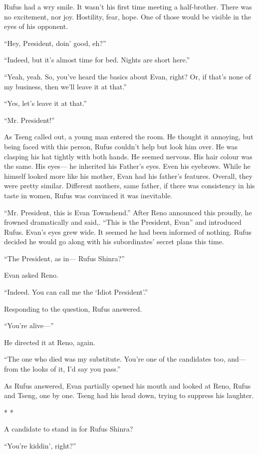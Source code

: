\documentclass[oneside]{book}
\begin{document}
Rufus had a wry smile. It wasn’t his first time meeting a half-brother. There was no excitement, nor joy. Hostility, fear, hope. One of those would be visible in the eyes of his opponent.

“Hey, President, doin’ good, eh?”

“Indeed, but it’s almost time for bed. Nights are short here.”

“Yeah, yeah. So, you’ve heard the basics about Evan, right? Or, if that’s none of my business, then we’ll leave it at that.”

“Yes, let’s leave it at that.”

“Mr. President!”

As Tseng called out, a young man entered the room. He thought it annoying, but being faced with this person, Rufus couldn’t help but look him over. He was clasping his hat tightly with both hands. He seemed nervous. His hair colour was the same. His eyes— he inherited his Father’s eyes. Even his eyebrows. While he himself looked more like his mother, Evan had his father’s features. Overall, they were pretty similar. Different mothers, same father, if there was consistency in his taste in women, Rufus was convinced it was inevitable.

“Mr. President, this is Evan Townshend.” After Reno announced this proudly, he frowned dramatically and said,. “This is the President, Evan” and introduced Rufus. Evan’s eyes grew wide. It seemed he had been informed of nothing. Rufus decided he would go along with his subordinates’ secret plans this time.

“The President, as in— Rufus Shinra?”

Evan asked Reno.

“Indeed. You can call me the ‘Idiot President’.”

Responding to the question, Rufus answered.

“You’re alive—”

He directed it at Reno, again.

“The one who died was my substitute. You’re one of the candidates too, and— from the looks of it, I’d say you pass.”

As Rufus answered, Evan partially opened his mouth and looked at Reno, Rufus and Tseng, one by one. Tseng had his head down, trying to suppress his laughter.

* *

A candidate to stand in for Rufus Shinra?

“You’re kiddin’, right?”
\end{document}

